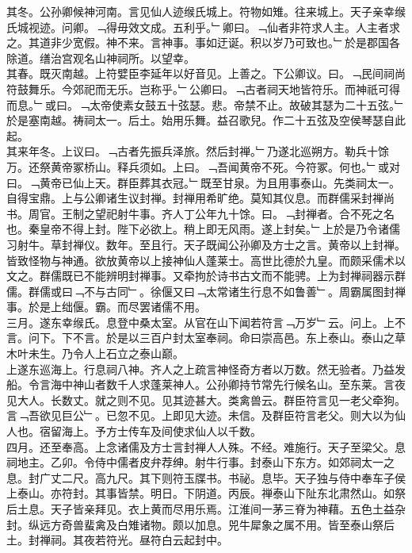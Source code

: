 \documentclass{zhvt-classic}
\begin{document}
\hspace*{2em}其冬。公孙卿候神河南。言见仙人迹缑氏城上。符物如雉。往来城上。天子亲幸缑氏城视迹。问卿。﹁得毋效文成。五利乎。﹂卿曰。﹁仙者非符求人主。人主者求之。其道非少宽假。神不来。言神事。事如迂诞。积以岁乃可致也。﹂於是郡国各除道。缮治宫观名山神祠所。以望幸。\\
\hspace*{2em}其春。既灭南越。上符嬖臣李延年以好音见。上善之。下公卿议。曰。﹁民间祠尚符鼓舞乐。今郊祀而无乐。岂称乎。﹂公卿曰。﹁古者祠天地皆符乐。而神祇可得而息。﹂或曰。﹁太帝使素女鼓五十弦瑟。悲。帝禁不止。故破其瑟为二十五弦。﹂於是塞南越。祷祠太一。后土。始用乐舞。益召歌兒。作二十五弦及空侯琴瑟自此起。\\
\hspace*{2em}其来年冬。上议曰。﹁古者先振兵泽旅。然后封禅。﹂乃遂北巡朔方。勒兵十馀万。还祭黄帝冢桥山。释兵须如。上曰。﹁吾闻黄帝不死。今符冢。何也。﹂或对曰。﹁黄帝已仙上天。群臣葬其衣冠。﹂既至甘泉。为且用事泰山。先类祠太一。\\
\hspace*{2em}自得宝鼎。上与公卿诸生议封禅。封禅用希旷绝。莫知其仪息。而群儒采封禅尚书。周官。王制之望祀射牛事。齐人丁公年九十馀。曰。﹁封禅者。合不死之名也。秦皇帝不得上封。陛下必欲上。稍上即无风雨。遂上封矣。﹂上於是乃令诸儒习射牛。草封禅仪。数年。至且行。天子既闻公孙卿及方士之言。黄帝以上封禅。皆致怪物与神通。欲放黄帝以上接神仙人蓬莱士。高世比德於九皇。而颇采儒术以文之。群儒既已不能辨明封禅事。又牵拘於诗书古文而不能骋。上为封禅祠器示群儒。群儒或曰﹁不与古同﹂。徐偃又曰﹁太常诸生行息不如鲁善﹂。周霸属图封禅事。於是上绌偃。霸。而尽罢诸儒不用。\\
\hspace*{2em}三月。遂东幸缑氏。息登中桑太室。从官在山下闻若符言﹁万岁﹂云。问上。上不言。问下。下不言。於是以三百户封太室奉祠。命曰崇高邑。东上泰山。泰山之草木叶未生。乃令人上石立之泰山巅。\\
\hspace*{2em}上遂东巡海上。行息祠八神。齐人之上疏言神怪奇方者以万数。然无验者。乃益发船。令言海中神山者数千人求蓬莱神人。公孙卿持节常先行候名山。至东莱。言夜见大人。长数丈。就之则不见。见其迹甚大。类禽兽云。群臣符言见一老父牵狗。言﹁吾欲见巨公﹂。已忽不见。上即见大迹。未信。及群臣符言老父。则大以为仙人也。宿留海上。予方士传车及间使求仙人以千数。\\
\hspace*{2em}四月。还至奉高。上念诸儒及方士言封禅人人殊。不经。难施行。天子至梁父。息祠地主。乙卯。令侍中儒者皮弁荐绅。射牛行事。封泰山下东方。如郊祠太一之息。封广丈二尺。高九尺。其下则符玉牒书。书祕。息毕。天子独与侍中奉车子侯上泰山。亦符封。其事皆禁。明日。下阴道。丙辰。禅泰山下阯东北肃然山。如祭后土息。天子皆亲拜见。衣上黄而尽用乐焉。江淮间一茅三脊为神藉。五色土益杂封。纵远方奇兽蜚禽及白雉诸物。颇以加息。兕牛犀象之属不用。皆至泰山祭后土。封禅祠。其夜若符光。昼符白云起封中。\\
\end{document}
